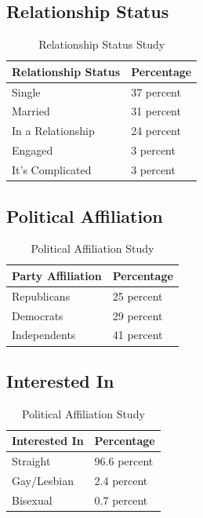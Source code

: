 \documentclass{article}
\begin{document}
\subsection*{Relationship Status}
\begin{table}[H]
\centering
\begin{tabular}{|p{3cm}||p{3cm}|} 
 \hline
 Relationship Status & Percentage \\ [0.5ex] 
 \hline\hline
 Single & 37 percent \\
 \hline
 Married & 31 percent \\
 \hline
 In a Relationship & 24 percent \\
 \hline
 Engaged & 3 percent \\
 \hline
 It's Complicated & 3 percent \\ [1ex] 
 \hline
\end{tabular}
\caption{Relationship Status Study \cite{relstatuswebsite}}
\label{table:2}
\end{table}

\subsection*{Political Affiliation}
\begin{table}[H]
\centering
\begin{tabular}{|p{3cm}||p{3cm}|} 
 \hline
 Party Affiliation & Percentage \\ [0.5ex] 
 \hline\hline
 Republicans & 25 percent \\
 \hline
 Democrats & 29 percent \\
 \hline
 Independents & 41 percent \\ [1ex] 
 \hline
\end{tabular}
\caption{Political Affiliation Study \cite{polstatuswebsite}}
\label{table:3}
\end{table}

\subsection*{Interested In}
\begin{table}[H]
\centering
\begin{tabular}{|p{3cm}||p{3cm}|} 
 \hline
 Interested In & Percentage \\ [0.5ex] 
 \hline\hline
 Straight & 96.6 percent \\
 \hline
 Gay/Lesbian & 2.4 percent \\
 \hline
 Bisexual & 0.7 percent \\ [1ex] 
 \hline
\end{tabular}
\caption{Political Affiliation Study \cite{interestedinwebsite}}
\label{table:4}
\end{table}
\end{document}
